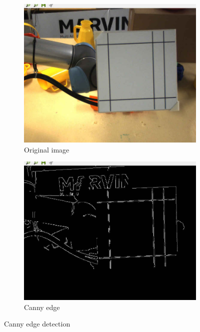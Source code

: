 \begin{figure}[ht!]
	\begin{subfigure}{.49\textwidth}
		\centering
		\includegraphics[width=\textwidth]{figures/lines1}
	\caption{Original image}
	\label{fig:l1}
	\end{subfigure}
	\begin{subfigure}{0.49\textwidth}
		\centering
		\includegraphics[width=\textwidth]{figures/lines2}
	\caption{Canny edge}
	\label{fig:l2}
	\end{subfigure}
\caption{Canny edge detection}
\label{fig:linesCanny}
\end{figure}

